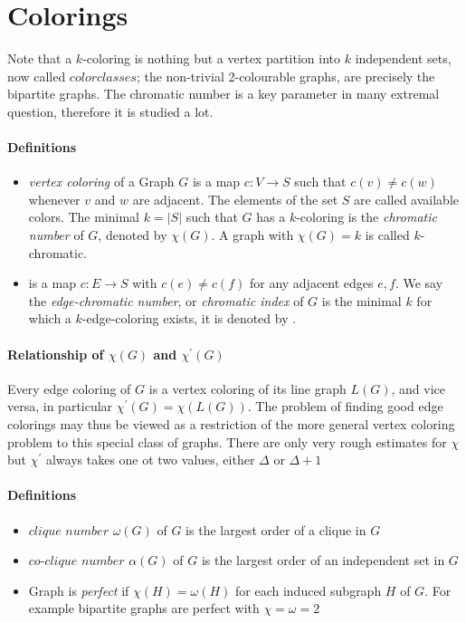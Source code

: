 \section{Colorings}
Note that a $k$-coloring is nothing but a vertex partition into 
$k$ independent sets, now called $ color classes$; the non-trivial
2-colourable graphs, are precisely the bipartite graphs.
The chromatic number is a key parameter in many extremal question, therefore
it is studied a lot.

\paragraph{Definitions}
\begin{itemize}
    \item \textit{vertex coloring} of a Graph $ G $ is a map 
    $c: V \to S $ such that $ c(v) \neq c(w) $ whenever $ v $ and 
    $ w $ are adjacent. The elements of the set $ S $ are called 
    available colors. The minimal $ k = |S| $ such that $ G $ has a
    $k$-coloring is the \textit{chromatic number} of $ G $, denoted 
    by $ \chi(G) $. A graph with $ \chi(G) = k $ is called $k$-chromatic.

    \item {} is a map $c: E \to S $ with $ c(e) \neq c(f) $
    for any adjacent edges $ e,f $. We say the \textit{edge-chromatic number},
    or \textit{chromatic index} of $ G $ is the minimal $ k $ for which 
    a $k$-edge-coloring exists, it is denoted by . 
\end{itemize}

\paragraph{Relationship of $\chi(G)$ and $\chi^\prime(G)$}
Every edge coloring of $ G $ is a vertex coloring of its line graph
$ L(G) $, and vice versa, in particular $ \chi^\prime(G) = \chi(L(G))$.
The problem of finding good edge colorings may thus be viewed as a 
restriction of the more general vertex coloring problem to this special 
class of graphs. There are only very rough estimates for $\chi$ but 
$\chi^\prime$ always takes one ot two values, either $ \Delta $ or 
$ \Delta + 1$

\paragraph{Definitions}
\begin{itemize}
    \item $clique$ $number$ $\omega(G)$ of $G$ is the largest order of a clique in $G$
    \item $co$-$clique$ $number$ $\alpha(G)$ of $G$ is the largest order of an independent set in $G$
    \item  Graph is \textit{perfect} if $\chi(H) = \omega(H)$ for each induced
    subgraph $H$ of $G$. For example bipartite graphs are perfect with $\chi=\omega=2$
\end{itemize}

